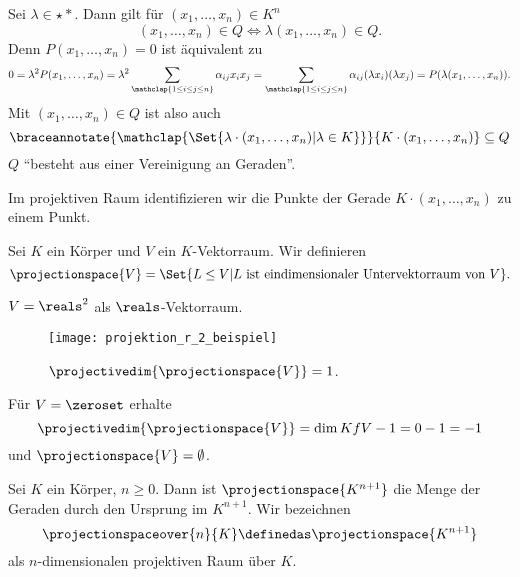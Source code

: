 Sei \( \lambda\in \star{*} \). Dann gilt für \( (x_1,\dotsc,x_n)\in K^n \)
\begin{equation*}
  (x_1,\dotsc,x_n)\in Q\iff \lambda(x_1,\dotsc,x_n)\in Q.
\end{equation*}
Denn \( P(x_1,\dotsc,x_n)=0 \) ist äquivalent zu 
\begin{equation*}
  0=\lambda^2 P(x_1,\dotsc,x_n)=\lambda^2 \sum_{\mathclap{1\leq i\leq j\leq n}} \alpha_{ij}x_i x_j=\sum_{\mathclap{1\leq i\leq j\leq n}} \alpha_{ij}(\lambda x_i)(\lambda x_j)=P(\lambda(x_1,\dotsc,x_n)).
\end{equation*}
Mit \( (x_1,\dotsc,x_n)\in Q \) ist also auch
\begin{equation*}
  \braceannotate{\mathclap{\Set{\lambda\cdot (x_1,\dotsc,x_n)|\lambda\in K}}}{K\cdot (x_1,\dotsc, x_n)}\subseteq Q
\end{equation*}
\dh \( Q \) \enquote{besteht aus einer Vereinigung an Geraden}.
\begin{idee*}
  Im projektiven Raum identifizieren wir die Punkte der Gerade \( K\cdot(x_1,\dotsc,x_n) \) zu einem Punkt.
\end{idee*}  
\begin{definition*}
  Sei \( K \) ein Körper und \( V \) ein \( K \)-Vektorraum. Wir definieren
  \begin{equation*}
    \projectionspace{V}=\Set{L\leq V| L\ \text{ist eindimensionaler Untervektorraum von \( V \)}}.
  \end{equation*}
\end{definition*}
\begin{beispiel*}
  \( V=\reals^2 \) als \( \reals \)-Vektorraum.
  \begin{figure}[H]
    \centering
    \texttt{[image: projektion\_r\_2\_beispiel]}
    \caption*{\( \projectivedim{\projectionspace{V}}=1 \).}
    \label{fig:projektion_r_2_beispiel}
  \end{figure}
\end{beispiel*}
\begin{bemerkung*}
  Für \( V=\zeroset \) erhalte
  \begin{equation*}
    \projectivedim{\projectionspace{V}}=\dim{K}{f{V}}-1=0-1=-1
  \end{equation*}
  und \( \projectionspace{V}=\emptyset \).
\end{bemerkung*}
\begin{bspdef}
  Sei \( K \) ein Körper, \( n\geq 0 \). Dann ist \( \projectionspace{K^{n+1}} \) die Menge der Geraden durch den Ursprung im \( K^{n+1} \). Wir bezeichnen
  \begin{equation*}
    \projectionspaceover{n}{K}\definedas \projectionspace{K^{n+1}}
  \end{equation*}
  als \( n \)-dimensionalen projektiven Raum über \( K \).
\end{bspdef}
